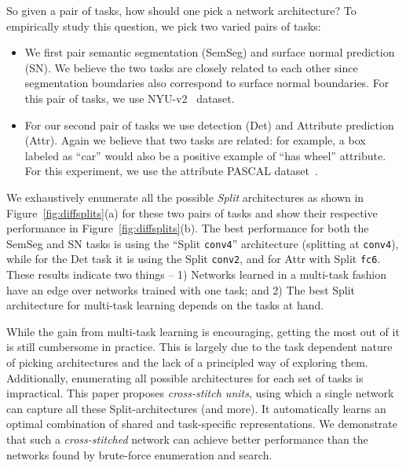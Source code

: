 \documentclass[10pt,twocolumn,letterpaper]{article}
\begin{document}
So given a pair of tasks, how should one pick a network architecture? To empirically study this question, we pick two varied pairs of tasks:

\begin{itemize}[leftmargin=*]
\itemsep0em
\item We first pair semantic segmentation (SemSeg) and surface normal prediction (SN). We believe the two tasks are closely related to each other since segmentation boundaries also correspond to surface normal boundaries. For this pair of tasks, we use NYU-v2~\cite{nyuv2} dataset.

\item For our second pair of tasks we use detection (Det) and Attribute prediction (Attr). Again we believe that two tasks are related: for example, a box labeled as ``car'' would also be a positive example of ``has wheel'' attribute. For this experiment, we use the attribute PASCAL dataset~\cite{pascal,apascal}.
\end{itemize}


We exhaustively enumerate all the possible \emph{Split} architectures as shown in Figure~\ref{fig:diffsplits}(a) for these two pairs of tasks and  show their respective performance in Figure~\ref{fig:diffsplits}(b). The best performance for both the SemSeg and SN tasks is using the ``Split \texttt{conv4}'' architecture (splitting at \texttt{conv4}), while for the Det task it is using the Split \texttt{conv2}, and for Attr with Split \texttt{fc6}. These results indicate two things -- 1) Networks learned in a multi-task fashion have an edge over networks trained with one task; and 2) The best Split architecture for multi-task learning depends on the tasks at hand.

While the gain from multi-task learning is encouraging, getting the most out of it is still cumbersome in practice. This is largely due to the task dependent nature of picking architectures and the lack of a principled way of exploring them. Additionally, enumerating all possible architectures for each set of tasks is impractical. This paper proposes \emph{cross-stitch units}, using which a single network can capture all these Split-architectures (and more). It automatically learns an optimal combination of shared and task-specific representations. We demonstrate that such a \emph{cross-stitched} network can achieve better performance than the networks found by brute-force enumeration and search.
\end{document}
